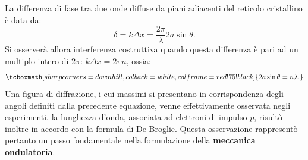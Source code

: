 \newpage
La differenza di fase tra due onde diffuse  da piani adiacenti del reticolo cristallino è data da:
	\begin{equation}
		\delta = k \Delta x = \frac{2 \pi}{\lambda} 2a \sin \theta.
	\end{equation}
Si osserverà allora interferenza costruttiva quando questa differenza è pari ad un multiplo intero di $2 \pi$: $k \Delta x = 2 \pi n$, ossia:
	\begin{equation}
		\tcboxmath[sharp corners=downhill ,colback=white,colframe=red!75!black]{
			2a \sin \theta = n\lambda.
			}
	\end{equation}
Una figura di diffrazione, i cui massimi si presentano in corrispondenza degli angoli definiti dalla precedente equazione, venne effettivamente osservata negli esperimenti. la lunghezza d'onda, associata ad elettroni di impulso $p$, risultò inoltre in accordo con la formula di De Broglie. Questa osservazione rappresentò pertanto un passo fondamentale nella formulazione della \textbf{meccanica ondulatoria}.
